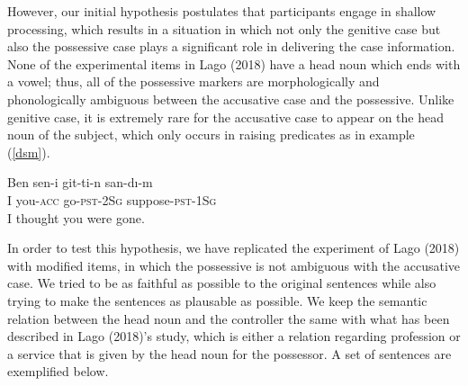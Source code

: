 \documentclass[doc]{apa6}
\begin{document}
However, our initial hypothesis postulates that participants engage in
shallow processing, which results in a situation in which not only the
genitive case but also the possessive case plays a significant role in
delivering the case information. None of the experimental items in Lago
(2018) have a head noun which ends with a vowel; thus, all of the
possessive markers are morphologically and phonologically ambiguous
between the accusative case and the possessive. Unlike genitive case, it
is extremely rare for the accusative case to appear on the head noun of
the subject, which only occurs in raising predicates as in example
(\ref{dsm}).

\begin{exe}
\ex \label{dsm}
\gll Ben sen-i git-ti-n san-d{\i}-m\\
I you-\textsc{acc} go-\textsc{pst}-\textsc{2Sg} suppose-\textsc{pst}-\textsc{1Sg}\\
\glt I thought you were gone.
\end{exe}

In order to test this hypothesis, we have replicated the experiment of
Lago (2018) with modified items, in which the possessive is not
ambiguous with the accusative case. We tried to be as faithful as
possible to the original sentences while also trying to make the
sentences as plausable as possible. We keep the semantic relation
between the head noun and the controller the same with what has been
described in Lago (2018)'s study, which is either a relation regarding
profession or a service that is given by the head noun for the
possessor. A set of sentences are exemplified below.
\end{document}
